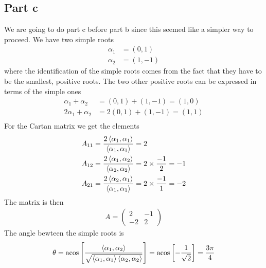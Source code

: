 \documentclass[a4paper,12pt]{article}
\begin{document}
\subsection*{Part c}
We are going to do part c before part b since this seemed like a simpler way to proceed.
We have two simple roots
\begin{equation}
	\begin{aligned}
		\alpha_1&=(0,1)\\
		\alpha_2&=(1,-1)
	\end{aligned}
\end{equation}
where the identification of the simple roots comes from the fact that they have to be the smallest, positive roots.  The two other positive roots can be expressed in terms of the simple ones
\begin{equation}
	\begin{aligned}
		\alpha_{1}+\alpha_2&=(0,1)+(1,-1)=(1,0)\\
		2\alpha_{1}+\alpha_2&=2(0,1)+(1,-1)=(1,1)\\
	\end{aligned}
\end{equation}
For the Cartan matrix we get the elements
\begin{equation}
	\begin{aligned}
		A_{11}&=\frac{2\expval{\alpha_1,\alpha_1}}{\expval{\alpha_1,\alpha_1}}=2\\
		A_{12}&=\frac{2\expval{\alpha_1,\alpha_2}}{\expval{\alpha_2,\alpha_2}}=2\times \frac{-1}{2}=-1\\
		A_{21}&=\frac{2\expval{\alpha_2,\alpha_1}}{\expval{\alpha_1,\alpha_1}}=2\times \frac{-1}{1}=-2\\
	\end{aligned}
\end{equation}
The matrix is then
\begin{equation}
	\begin{aligned}
		A=\begin{pmatrix}
			2 & -1 \\
			-2 & 2
		\end{pmatrix}
	\end{aligned}
\end{equation}
The angle bewteen the simple roots is
\begin{equation}
	\begin{aligned}
		\theta=\acos\left[\frac{\expval{\alpha_1,\alpha_2}}{\sqrt{\expval{\alpha_1,\alpha_1}\expval{\alpha_2,\alpha_2}}}\right]=\acos\left[-\frac{1}{\sqrt{2}}\right]=\frac{3\pi}{4}
	\end{aligned}
\end{equation}
\end{document}
